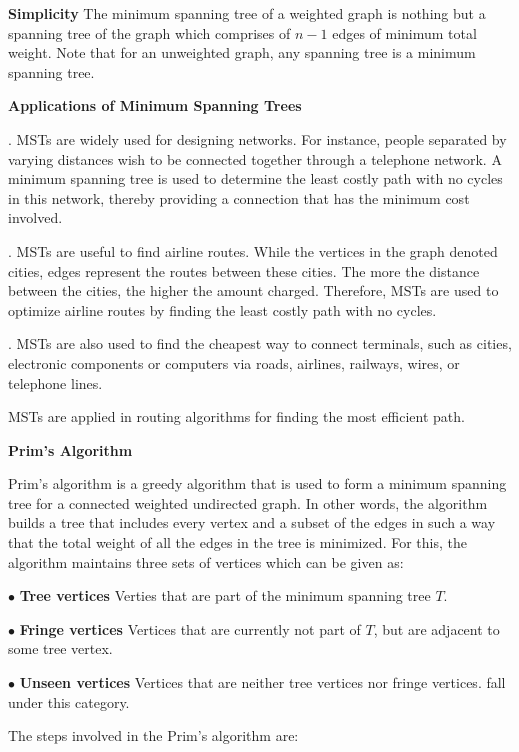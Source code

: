 \vskip 3mm
{\bf Simplicity} The minimum spanning tree of a weighted graph is nothing but a spanning tree of the graph which comprises of $n-1$ edges of minimum total weight. Note that for an unweighted graph, any spanning tree is a minimum spanning tree.

\vskip 3mm
{\bf Applications of Minimum Spanning Trees}

\vskip 1mm
. MSTs are widely used for designing networks. For instance, people separated by varying distances wish to be connected together through a telephone network. A minimum spanning tree is used to determine the least costly path with no cycles in this network, thereby providing a connection that has the minimum cost involved.

\vskip 3mm
. MSTs are useful to find airline routes. While the vertices in the graph denoted cities, edges represent the routes between these cities. The more the distance between the cities, the higher the amount charged. Therefore, MSTs are used to optimize airline routes by finding the least costly path with no cycles.

\vskip 3mm
. MSTs are also used to find the cheapest way to connect terminals, such as cities, electronic components or computers via roads, airlines, railways, wires, or telephone lines.

\vskip 3mm
\qquad MSTs are applied in routing algorithms for finding the most efficient path.

\filbreak
\vskip 1cm
{\bf Prim's Algorithm}

\vskip 1mm
Prim's algorithm is a greedy algorithm that is used to form a minimum spanning tree for a connected weighted undirected graph. In other words, the algorithm builds a tree that includes every vertex and a subset of the edges in such a way that the total weight of all the edges in the tree is minimized. For this, the algorithm maintains three sets of vertices which can be given as:

\vskip 3mm
\qquad$\bullet$ {\bf Tree vertices} Verties that are part of the minimum spanning tree $T$.

\vskip 3mm
\qquad$\bullet$ {\bf Fringe vertices} Vertices that are currently not part of $T$, but are adjacent to some tree vertex.

\vskip 3mm
\qquad$\bullet$ {\bf Unseen vertices} Vertices that are neither tree vertices nor fringe vertices. fall under this category.

\vskip 2mm
The steps involved in the Prim's algorithm are:

